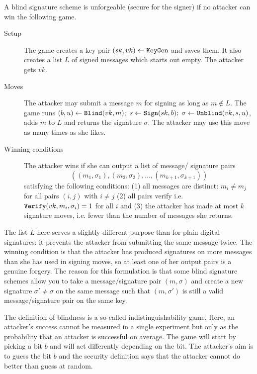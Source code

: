 \documentclass{llncs}
\newcommand{\alg}[1]{\textup{\texttt{#1}}}
\begin{document}
\begin{definition}
A blind signature scheme is unforgeable (secure for the signer) if no attacker
can win the following game.

\begin{description}
\item[Setup] The game creates a key pair $(sk, vk) \gets \alg{KeyGen}$ and saves
them. It also creates a list $L$ of signed messages which starts out empty. The
attacker gets $vk$.

\item[Moves] The attacker may submit a message $m$ for signing as long as
$m \notin L$. The game runs $(b, u) \gets \alg{Blind}(vk, m);$ $s \gets
\alg{Sign}(sk, b);$ $\sigma \gets \alg{Unblind}(vk, s, u)$,
adds $m$ to $L$ and returns the signature $\sigma$. The attacker may use this
move as many times as she likes.

\item[Winning conditions] The attacker wins if she can output a list of message/
signature pairs
\[
((m_1, \sigma_1), (m_2, \sigma_2), \ldots, (m_{k+1}, \sigma_{k+1}))
\]
satisfying the following conditions: (1) all messages are distinct: $m_i \neq m_j$
for all pairs $(i, j)$ with $i \neq j$ (2) all pairs verify i.e.
$\alg{Verify}(vk, m_i, \sigma_i) = 1$ for all $i$ and
(3) the attacker has made at most $k$ signature moves, i.e. fewer than the number
of messages she returns.
\end{description}
\end{definition}

The list $L$ here serves a slightly different purpose than for plain digital
signatures: it prevents the attacker from submitting the same message twice. The
winning condition is that the attacker has produced signatures on more messages
than she has used in signing moves, so at least one of her output pairs is a
genuine forgery. The reason for this formulation is that some blind signature
schemes allow you to take a message/signature pair $(m, \sigma)$ and create a
new signature $\sigma' \neq \sigma$ on the same message such that $(m, \sigma')$
is still a valid message/signature pair on the same key.

The definition of blindness is a so-called indistinguishability game. Here, an
attacker's success cannot be measured in a single experiment but only as the
probability that an attacker is successful on average. The game will start by
picking a bit $b$ and will act differently depending on the bit. The attacker's
aim is to guess the bit $b$ and the security definition says that the attacker
cannot do better than guess at random.
\end{document}
